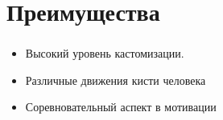 \section{Преимущества}

\begin{frame}
\frametitle{\insertsection} 
\framesubtitle{\insertsubsection}
    \begin{itemize}
        \item Высокий уровень кастомизации.
        \item Различные движения кисти человека
        \item Соревновательный аспект в мотивации
    \end{itemize}
\end{frame}